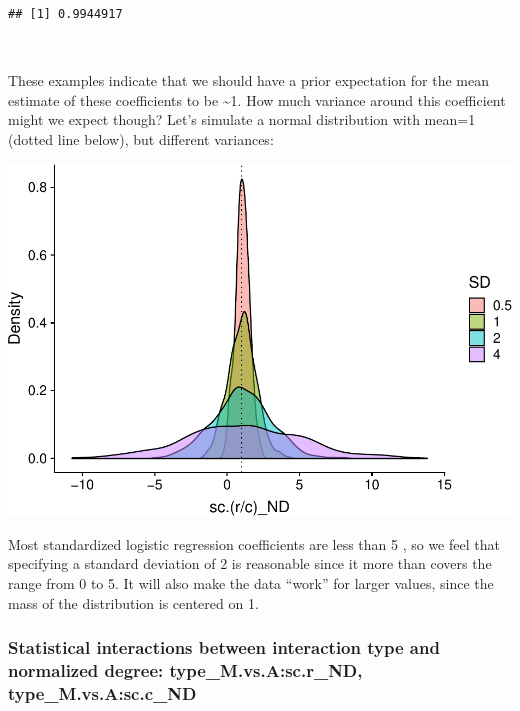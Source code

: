 \documentclass[11pt,]{article}
\let\origfigure\figure
\let\endorigfigure\endfigure
\renewenvironment{figure}[1][2] {
    \expandafter\origfigure\expandafter[H]
} {
    \endorigfigure
}
\begin{document}
\begin{verbatim}
## [1] 0.9944917
\end{verbatim}

~

These examples indicate that we should have a prior expectation for the
mean estimate of these coefficients to be \textasciitilde{}1. How much
variance around this coefficient might we expect though? Let's simulate
a normal distribution with mean=1 (dotted line below), but different
variances:

\begin{figure}
\centering
\includegraphics{reproduce_analyses_files/figure-latex/simulate prior distribution for normalized degree-1.pdf}
\caption{Simulating prior distributions for the effect of scaled
normalized degree.}
\end{figure}

Most standardized logistic regression coefficients are less than 5
\citep{Gelman2008}, so we feel that specifying a standard deviation of 2
is reasonable since it more than covers the range from 0 to 5. It will
also make the data ``work'' for larger values, since the mass of the
distribution is centered on 1.

\subsubsection{\texorpdfstring{Statistical interactions between
interaction type and normalized degree: \textbf{type\_M.vs.A:sc.r\_ND},
\textbf{type\_M.vs.A:sc.c\_ND}}{Statistical interactions between interaction type and normalized degree: type\_M.vs.A:sc.r\_ND, type\_M.vs.A:sc.c\_ND}}\label{statistical-interactions-between-interaction-type-and-normalized-degree-type_m.vs.asc.r_nd-type_m.vs.asc.c_nd}
\end{document}
